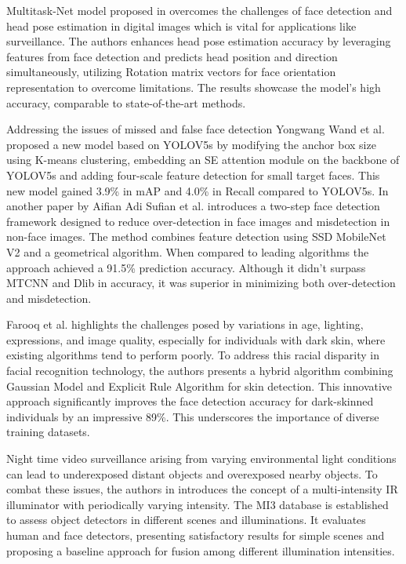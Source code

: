 Multitask-Net model proposed in \cite{viet_simultaneous_2021} overcomes the challenges of face detection and head pose estimation in digital images which is vital for applications like surveillance. The authors enhances head pose estimation accuracy by leveraging features from face detection and predicts head position and direction simultaneously, utilizing Rotation matrix vectors for face orientation representation to overcome limitations. The results showcase the model's high accuracy, comparable to state-of-the-art methods.

Addressing the issues of missed and false face detection Yongwang Wand et al. \cite{wang_yolov5s-face_2022} proposed a new model based on YOLOV5s by modifying the anchor box size using K-means clustering, embedding an SE attention module on the backbone of YOLOV5s and adding four-scale feature detection for small target faces. This new model gained 3.9\% in mAP and 4.0\% in Recall compared to YOLOV5s. In another paper by Aifian Adi Sufian et al. \cite{chan_face_2022} introduces a two-step face detection framework designed to reduce over-detection in face images and misdetection in non-face images. The method combines feature detection using SSD MobileNet V2 and a geometrical algorithm. When compared to leading algorithms the approach achieved a 91.5\% prediction accuracy. Although it didn't surpass MTCNN and Dlib in accuracy, it was superior in minimizing both over-detection and misdetection.

Farooq et al. \cite{farooq_hybrid_2021} highlights the challenges posed by variations in age, lighting, expressions, and image quality, especially for individuals with dark skin, where existing algorithms tend to perform poorly. To address this racial disparity in facial recognition technology, the authors presents a hybrid algorithm combining Gaussian Model and Explicit Rule Algorithm for skin detection. This innovative approach significantly improves the face detection accuracy for dark-skinned individuals by an impressive 89\%. This underscores the importance of diverse training datasets.

Night time video surveillance arising from varying environmental light conditions can lead to underexposed distant objects and overexposed nearby objects. To combat these issues, the authors in \cite{lu_fusion_2022} introduces the concept of a multi-intensity IR illuminator with periodically varying intensity. The MI3 database is established to assess object detectors in different scenes and illuminations. It evaluates human and face detectors, presenting satisfactory results for simple scenes and proposing a baseline approach for fusion among different illumination intensities.

